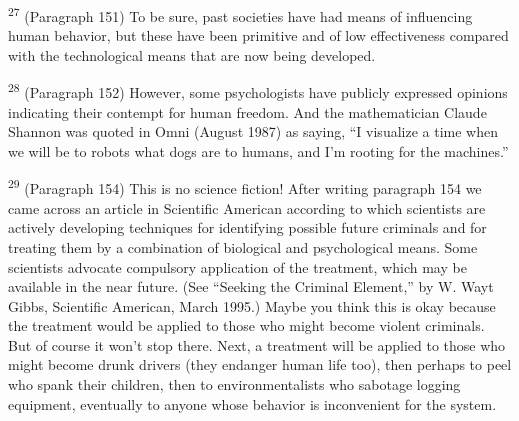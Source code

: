\documentclass{article}
\begin{document}
\textsuperscript{27} (Paragraph 151) To be sure, past societies have had means of influencing human behavior, but 
these have been primitive and of low effectiveness compared with the technological means that 
are now being developed. \vspace{\baselineskip} \newpage

\textsuperscript{28} (Paragraph 152) However, some psychologists have publicly expressed opinions indicating 
their contempt for human freedom.  And the mathematician Claude Shannon was quoted in 
Omni (August 1987) as saying, “I visualize a time when we will be to robots what dogs are to 
humans, and I’m rooting for the machines.”  \vspace{\baselineskip}

\textsuperscript{29} (Paragraph 154) This is no science fiction! After writing paragraph 154 we came across an 
article in Scientific American according to which scientists are actively developing techniques 
for identifying possible future criminals and for treating them by a combination of biological and 
psychological means.  Some scientists advocate compulsory application of the treatment, which 
may be available in the near future.  (See “Seeking the Criminal Element,” by W.  Wayt Gibbs, 
Scientific American, March 1995.) Maybe you think this is okay because the treatment would be 
applied to those who might become violent criminals.  But of course it won’t stop there.  Next, a 
treatment will be applied to those who might become drunk drivers (they endanger human life 
too), then perhaps to peel who spank their children, then to environmentalists who sabotage 
logging equipment, eventually to anyone whose behavior is inconvenient for the system.  \vspace{\baselineskip}
\end{document}
